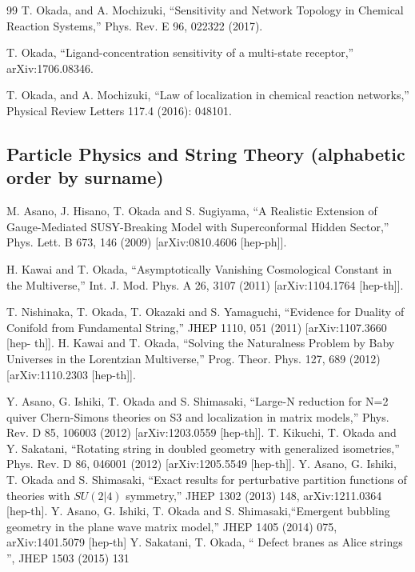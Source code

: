 \documentclass[letterpaper,12pt]{article}
\begin{document}
\begin{thebibliography}{99}
 T. Okada, and A. Mochizuki, ``Sensitivity and Network Topology in Chemical Reaction Systems,'' Phys. Rev. E 96, 022322 (2017).

 T. Okada, ``Ligand-concentration sensitivity of a multi-state receptor,''  arXiv:1706.08346.

 T. Okada,  and A. Mochizuki, ``Law of localization in chemical reaction networks,''  Physical Review Letters 117.4 (2016): 048101.

\subsection*{Particle Physics and String Theory (alphabetic order by surname)}
\bibitem{} M. Asano, J. Hisano, T. Okada and S. Sugiyama, ``A Realistic Extension of Gauge-Mediated SUSY-Breaking Model with Superconformal Hidden Sector,'' Phys. Lett. B 673, 146 (2009) [arXiv:0810.4606 [hep-ph]].

\bibitem{} H. Kawai and T. Okada, ``Asymptotically Vanishing Cosmological Constant in the Multiverse,'' Int. J. Mod. Phys. A 26, 3107 (2011) [arXiv:1104.1764 [hep-th]].

\bibitem{} T. Nishinaka, T. Okada, T. Okazaki and S. Yamaguchi, ``Evidence for Duality of Conifold from Fundamental String,'' JHEP 1110, 051 (2011) [arXiv:1107.3660 [hep- th]].
\bibitem{}  H. Kawai and T. Okada, ``Solving the Naturalness Problem by Baby Universes in the Lorentzian Multiverse,''  Prog. Theor. Phys. 127, 689 (2012) [arXiv:1110.2303 [hep-th]].

\bibitem{} Y. Asano, G. Ishiki, T. Okada and S. Shimasaki, ``Large-N reduction for N=2 quiver Chern-Simons theories on S3 and localization in matrix models,'' Phys. Rev. D 85, 106003 (2012) [arXiv:1203.0559 [hep-th]].
\bibitem{} T. Kikuchi, T. Okada and Y. Sakatani, ``Rotating string in doubled geometry with generalized isometries,'' Phys. Rev. D 86, 046001 (2012) [arXiv:1205.5549 [hep-th]].
 Y. Asano, G. Ishiki, T. Okada and S. Shimasaki, ``Exact results for perturbative partition functions of theories with $S U (2|4)$ symmetry,''  JHEP 1302 (2013) 148, arXiv:1211.0364 [hep-th].
\bibitem{} Y. Asano, G. Ishiki, T. Okada and S. Shimasaki,``Emergent bubbling geometry in the plane wave matrix model,'' JHEP 1405 (2014) 075, arXiv:1401.5079 [hep-th]
\bibitem{} Y. Sakatani, T. Okada, “ Defect branes as Alice strings ”, JHEP 1503 (2015) 131


\end{thebibliography}
\end{document}
